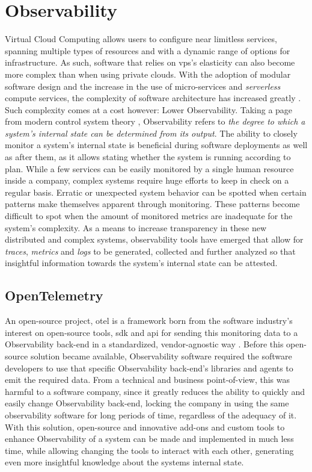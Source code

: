 \section{Observability}\label{state-of-the-art:s:observability}

Virtual Cloud Computing allows users to configure near limitless services, spanning multiple types of resources and with a dynamic range of options for infrastructure. As such, software that relies on \gls{vps}'s elasticity can also become more complex than when using private clouds. With the adoption of modular software design and the increase in the use of micro-services and \textit{serverless} compute services, the complexity of software architecture has increased greatly \Parencite{niedermaier_koetter_freymann_wagner_2019}.
Such complexity comes at a cost however: Lower Observability. Taking a page from modern control system theory \Parencite{gopal1993modern}, Observability refers to \textit{the degree to which a system's internal state can be determined from its output}. 
The ability to closely monitor a system's internal state is beneficial during software deployments as well as after them, as it allows stating whether the system is running according to plan.
While a few services can be easily monitored by a single human resource inside a company, complex systems require huge efforts to keep in check on a regular basis. 
Erratic or unexpected system behavior can be spotted when certain patterns make themselves apparent through monitoring. These patterns become difficult to spot when the amount of monitored metrics are inadequate for the system's complexity.
As a means to increase transparency in these new distributed and complex systems, observability tools have emerged that allow for \textit{traces}, \textit{metrics} and \textit{logs} to be generated, collected and further analyzed so that insightful information towards the system's internal state can be attested.

\subsection{OpenTelemetry}\label{state-of-the-art:ss:opentelemetry}

An open-source project, \gls{otel} is a framework born from the software industry's interest on open-source tools, \gls{sdk} and \gls{api} for sending this monitoring data to a Observability back-end in a standardized, vendor-agnostic way \Parencite{observability_primer_2022}. Before this open-source solution became available, Observability software required the software developers to use that specific Observability back-end's libraries and agents to emit the required data. From a technical and business point-of-view, this was harmful to a software company, since it greatly reduces the ability to quickly and easily change Observability back-end, locking the company in using the same observability software for long periods of time, regardless of the adequacy of it.
With this solution, open-source and innovative add-ons and custom tools to enhance Observability of a system can be made and implemented in much less time, while allowing changing the tools to interact with each other, generating even more insightful knowledge about the systems internal state.

